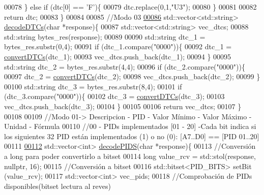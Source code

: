 \begin{DoxyCode}
00078     \} \textcolor{keywordflow}{else} \textcolor{keywordflow}{if} (dtc[0] == \textcolor{charliteral}{'F'})\{
00079         dtc.replace(0,1,\textcolor{stringliteral}{"U3"});
00080     \}
00081 
00082     \textcolor{keywordflow}{return} dtc;
00083 \}
00084 
00085 \textcolor{comment}{//Modo 03}
\hyperlink{decoders_8hpp_aac9b3d4ea17ee4dbbdf755b0b510137a}{00086} std::vector<std::string> \hyperlink{decoders_8cpp_aac9b3d4ea17ee4dbbdf755b0b510137a}{decodeDTCs}(\textcolor{keywordtype}{char} *response)\{
00087     std::vector<std::string> vec\_dtcs;
00088     std::string bytes\_res(response);
00089 
00090     std::string dtc\_1 = bytes\_res.substr(0,4);
00091     \textcolor{keywordflow}{if} (dtc\_1.compare(\textcolor{stringliteral}{"0000"}))\{
00092         dtc\_1 = \hyperlink{decoders_8cpp_a4f18f411252f4c60fae4af320989c262}{convertDTCs}(dtc\_1);
00093         vec\_dtcs.push\_back(dtc\_1);
00094     \}
00095     std::string dtc\_2 = bytes\_res.substr(4,4);
00096     \textcolor{keywordflow}{if} (dtc\_2.compare(\textcolor{stringliteral}{"0000"}))\{
00097         dtc\_2 = \hyperlink{decoders_8cpp_a4f18f411252f4c60fae4af320989c262}{convertDTCs}(dtc\_2);
00098         vec\_dtcs.push\_back(dtc\_2);
00099     \}
00100     std::string dtc\_3 = bytes\_res.substr(8,4);
00101     \textcolor{keywordflow}{if} (dtc\_3.compare(\textcolor{stringliteral}{"0000"}))\{
00102         dtc\_3 = \hyperlink{decoders_8cpp_a4f18f411252f4c60fae4af320989c262}{convertDTCs}(dtc\_3);
00103         vec\_dtcs.push\_back(dtc\_3);
00104     \}
00105 
00106     \textcolor{keywordflow}{return} vec\_dtcs;
00107 \}
00108 
00109     \textcolor{comment}{//Modo 01-> Descripcion - PID - Valor Mínimo - Valor Máximo - Unidad - Fórmula}
00110 \textcolor{comment}{//00 - PIDs implementados [01 - 20] -Cada bit indica si los siguientes 32 PID están implementados (1) o no
       (0): [A7..D0] == [PID 01..20] }
00111 
\hyperlink{decoders_8hpp_aef44cca306ed9c74b146d2b7dd058763}{00112} std::vector<int> \hyperlink{decoders_8cpp_aef44cca306ed9c74b146d2b7dd058763}{decodePIDS}(\textcolor{keywordtype}{char} *response)\{
00113     \textcolor{comment}{//Conversión a long para poder convertirlo a bitset}
00114     \textcolor{keywordtype}{long} value\_rcv = std::stol(response, \textcolor{keyword}{nullptr}, 16);
00115     \textcolor{comment}{//Conversión a bitset}
00116     std::bitset<PID\_BITS> setBit (value\_rcv);
00117     std::vector<int> vec\_pids;
00118     \textcolor{comment}{//Comprobación de PIDs disponibles(bitset lectura al reves)}

\end{DoxyCode}

